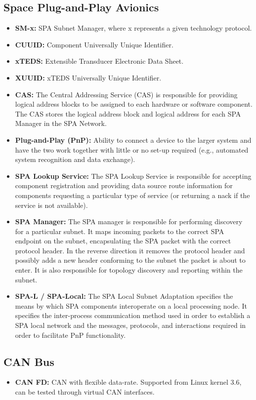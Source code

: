 \subsection{Space Plug-and-Play Avionics}
\begin{itemize}
    \item \textbf{SM-x:} SPA Subnet Manager, where x represents a given
        technology protocol.
    \item \textbf{CUUID:} Component Universally Unique Identifier.
    \item \textbf{xTEDS:} Extensible Transducer Electronic Data Sheet.
    \item \textbf{XUUID:} xTEDS Universally Unique Identifier.
    \item \textbf{CAS:} The Central Addressing Service (CAS) is
responsible for providing logical address blocks to be assigned to each
hardware or software component. The CAS stores the logical address block
and logical address for each SPA Manager in the SPA Network.
    \item \textbf{Plug-and-Play (PnP):} Ability to connect a device to the larger system and
have the two work together with little or no set-up required (e.g., automated
system recognition and data exchange).
    \item \textbf{SPA Lookup Service:} The SPA Lookup Service is responsible for accepting
component registration and providing data source route information for
components requesting a particular type of service (or returning a nack if
the service is not available).
    \item \textbf{SPA Manager:} The SPA manager is responsible for performing discovery for a
particular subnet. It maps incoming packets to the correct SPA endpoint on the
subnet, encapsulating the SPA packet with the correct protocol header. In the
reverse direction it removes the protocol header and possibly adds a new header
conforming to the subnet the packet is about to enter. It is also responsible
for topology discovery and reporting within the subnet.
    \item \textbf{SPA-L / SPA-Local:} The SPA Local Subnet Adaptation specifies the means
by which SPA components interoperate on a local processing node. It specifies
the inter-process communication method used in order to establish a SPA local
network and the messages, protocols, and interactions required in order to
facilitate PnP functionality.
\end{itemize}

\subsection{CAN Bus}
\begin{itemize}
    \item \textbf{CAN FD:} CAN with flexible data-rate. Supported from Linux kernel 3.6, can
be tested through virtual CAN interfaces.
\end{itemize}
